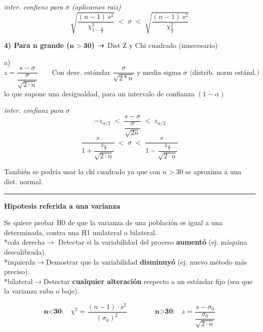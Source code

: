 \documentclass[10pt,a4paper]{article}
\begin{document}
{\footnotesize\textit{inter. confienz para $\sigma$ (aplicamos raiz)}}
\[
\sqrt{\frac{(n-1)\,s^2}{\chi^2_{1-\frac{\alpha}{2}}}} \;<\; \sigma \;<\; \sqrt{\frac{(n-1)\,s^2}{\chi^2_{\frac{\alpha}{2}}}}
\]

\textbf{4) Para n grande ($\mathbf{n>30}$)} \,$\dashrightarrow$\, Dist Z y Chi cuadrado (innecesario)

a)
\[
z = \frac{s-\sigma}{\dfrac{\sigma}{\sqrt{2\cdot n}}}
\qquad
\text{Con desv. estándar } \frac{\sigma}{\sqrt{2*n}} \text{ y media sigma } \sigma \text{ (distrib. norm estánd.)}
\]
lo que supone una desigualdad, para un intervalo de confianza $(1-\alpha)$

{\footnotesize\textit{inter. confianz para $\sigma$}}
\[
-z_{\alpha/2} \;<\; \frac{s-\sigma}{\dfrac{\sigma}{\sqrt{2n}}} \;<\; z_{\alpha/2}
\]
\[
\frac{s}{1+\dfrac{z_{\frac{\alpha}{2}}}{\sqrt{2\cdot n}}} \;<\; \sigma \;<\; \frac{s}{1-\dfrac{z_{\frac{\alpha}{2}}}{\sqrt{2\cdot n}}}
\]

También se podría usar la chi cuadrado ya que con $n > 30$ se aproxima a una dist. normal.

\vspace{4pt}
\hrule
\vspace{4pt}

{\large\bfseries Hipotesis referida a una varianza\par}
\vspace{2pt}

Se quiere probar H0 de que la varianza de una población es igual a una determinada, contra una H1 unilateral o bilateral.\\
*cola derecha$\rightarrow$ Detectar si la variabilidad del proceso \textbf{aumentó} (ej. máquina descalibrada).\\
*izquierda$\rightarrow$Demostrar que la variabilidad \textbf{disminuyó} (ej. nuevo método más preciso).\\
*bilateral$\rightarrow$Detectar \textbf{cualquier alteración} respecto a un estándar fijo (sea que la varianza suba o baje).

\[
\textbf{n<30:}\quad \chi^2 = \frac{(n-1)\cdot s^2}{\left(\sigma_0\right)^2}
\qquad\qquad
\textbf{n>30:}\quad z = \frac{s-\sigma_0}{\dfrac{\sigma_0}{\sqrt{2\cdot n}}}
\]
\end{document}
